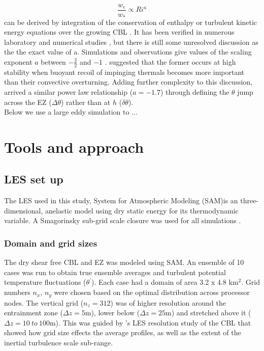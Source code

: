 \documentclass[referee]{svjour3}
\begin{document}
\begin{equation}\label{eq:ervsri}
\frac{w_{e}}{w_{*}} \propto Ri^{a}
\end{equation}
can be derived by integration of the conservation of enthalpy or turbulent kinetic energy equations over the growing CBL \citep{Tennekes73, Deardorff79, FedConzMir04}. It has been verified in numerous laboratory and numerical studies \citep{DearWill80, SullMoengStev, FedConzMir04, BrooksFowler2}, but there is still some unresolved discussion as the the exact value of a.  Simulations and observations give  values of the scaling exponent $a$ between $-\frac{3}{2}$ and $-1$ \citep{Traum11}.  \cite{Turner86} suggested that the former occurs at high stability when buoyant recoil of impinging thermals becomes more important than their convective overturning.  Adding further complexity to this discussion, \cite{FedConzMir04} arrived a similar power law relationship ($a = -1.7$) through defining the $\theta$ jump across the EZ ($\Delta \theta$) rather than at $h$ ($\delta \theta$).\\

Below we use a large eddy simulation to ...

\section{Tools and approach}

\subsection{LES set up}

The LES used in this study, System for Atmospheric Modeling (SAM)is an three-dimensional, anelastic model using dry static energy for its thermodynamic variable.  A Smagorinsky sub-grid scale closure was used for all simulations \citep{KhairRand}.

\subsubsection{Domain and grid sizes}
The dry shear free CBL and EZ was modeled using SAM.  An ensemble of 10 cases was run to obtain true ensemble averages and turbulent potential temperature fluctuations ($\theta^{'}$). Each case had a domain of area 3.2 x 4.8 km$^{2}$.  Grid numbers $n_{x}$, $n_{y}$ were chosen based on the optimal distribution across processor nodes. The vertical grid ($n_{z}=312$) was of higher resolution around the entrainment zone ($\Delta z = 5$m), lower below ($\Delta z = 25$m) and stretched above it ($\Delta z = 10 \ to \ 100 $m). This was guided by \cite{SullPat}'s LES resolution study of the CBL that showed how grid size effects the average profiles, as well as the extent of the inertial turbulence scale sub-range.\\
\end{document}
